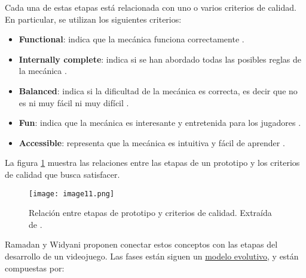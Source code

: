 \par Cada una de estas etapas está relacionada con uno o varios criterios de calidad. En particular, se utilizan los siguientes criterios:
\begin{itemize}
    \item \textbf{Functional}: indica que la mecánica funciona correctamente \cite{ramadanGameDevelopmentLife2013,fullertonGameDesignWorkshop2008}.
    \item \textbf{Internally complete}: indica si se han abordado todas las posibles reglas de la mecánica \cite{ramadanGameDevelopmentLife2013,fullertonGameDesignWorkshop2008}.
    \item \textbf{Balanced}: indica si la dificultad de la mecánica es correcta, es decir que no es ni muy fácil ni muy difícil \cite{ramadanGameDevelopmentLife2013,fullertonGameDesignWorkshop2008}.
    \item \textbf{Fun}: indica que la mecánica es interesante y entretenida para los jugadores \cite{ramadanGameDevelopmentLife2013,fullertonGameDesignWorkshop2008}.
    \item \textbf{Accessible}: representa que la mecánica es intuitiva y fácil de aprender \cite{ramadanGameDevelopmentLife2013,fullertonGameDesignWorkshop2008}.
\end{itemize}
\par La figura \ref{fig:x relacion entre prototipo y criterios de calidad} muestra las relaciones entre las etapas de un prototipo y los criterios de calidad que busca satisfacer.
%
\begin{figure}[h]
  \centering
  \texttt{[image: image11.png]}
  \caption{Relación entre etapas de prototipo y criterios de calidad. Extraída de \cite{ramadanGameDevelopmentLife2013}.}
  \label{fig:x relacion entre prototipo y criterios de calidad}
\end{figure}
\par Ramadan y Widyani \cite{ramadanGameDevelopmentLife2013} proponen conectar estos conceptos con las etapas del desarrollo de un videojuego. Las fases están siguen un \hyperref[sec:modelos_evolutivos]{modelo evolutivo}, y están compuestas por:
